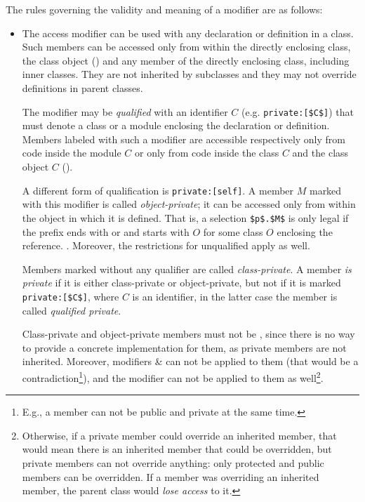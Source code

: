 The rules governing the validity and meaning of a modifier are as follows: 
\begin{itemize}
\item
The  access modifier can be used with any declaration or definition in a class. Such members can be accessed only from within the directly enclosing class, the class object () and any member of the directly enclosing class, including inner classes. They are not inherited by subclasses and they may not override definitions in parent classes. 

The modifier may be {\em qualified} with an identifier $C$ (e.g. \lstinline!private:[$C$]!) that must denote a class or a module enclosing the declaration or definition. Members labeled with such a modifier are accessible respectively only from code inside the module $C$ or only from code inside the class $C$ and the class object $C$ (). 

A different form of qualification is \lstinline!private:[self]!. A member $M$ marked with this modifier is called {\em object-private}; it can be accessed only from within the object in which it is defined. That is, a selection \lstinline!$p$.$M$! is only legal if the prefix ends with  or  and starts with $O$ for some class $O$ enclosing the reference. . Moreover, the restrictions for unqualified  apply as well. 

Members marked  without any qualifier are called {\em class-private}. A member {\em is private} if it is either class-private or object-private, but not if it is marked \lstinline!private:[$C$]!, where $C$ is an identifier, in the latter case the member is called {\em qualified private}. 

Class-private and object-private members must not be , since there is no way to provide a concrete implementation for them, as private members are not inherited. Moreover, modifiers  \&  can not be applied to them (that would be a contradiction\footnote{E.g., a member can not be public and private at the same time.}), and the modifier  can not be applied to them as well\footnote{Otherwise, if a private member could override an inherited member, that would mean there is an inherited member that could be overridden, but private members can not override anything: only protected and public members can be overridden. If a member was overriding an inherited member, the parent class would {\em lose access} to it.}. 


\end{itemize}

